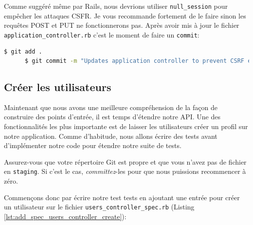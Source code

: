 \documentclass[]{report}
\begin{document}
      Comme suggéré même par Rails, nous devrions utiliser \verb|null_session| pour empêcher les attaques CSFR. Je vous recommande fortement de le faire sinon les requêtes POST et PUT ne fonctionnerons pas. Après avoir mis à jour le fichier \verb|application_controller.rb| c'est le moment de faire un \verb|commit|:

      \begin{scriptsize}
      \begin{lstlisting}[language=bash]
      $ git add .
      $ git commit -m "Updates application controller to prevent CSRF exception from being raised"
      \end{lstlisting}
      \end{scriptsize}

    \subsection{Créer les utilisateurs}\label{subsec:create_users}

      Maintenant que nous avons une meilleure compréhension de la façon de construire des points d'entrée, il est temps d'étendre notre API. Une des fonctionnalités les plus importante est de laisser les utilisateurs créer un profil sur notre application. Comme d'habitude, nous allons écrire des tests avant d'implémenter notre code pour étendre notre suite de tests.

      Assurez-vous que votre répertoire Git est propre et que vous n'avez pas de fichier en \verb|staging|. Si c'est le cas, \textit{committez}-les pour que nous puissions recommencer à zéro.

      Commençons donc par écrire notre test tests en ajoutant une entrée pour créer un utilisateur sur le fichier \verb|users_controller_spec.rb| (Listing \ref{lst:add_spec_users_controller_create}):
\end{document}
